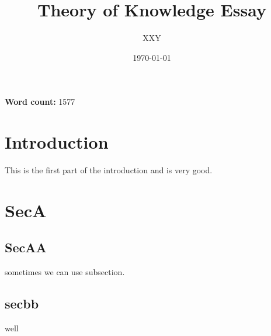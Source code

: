 \documentclass[12pt,a4paper]{article}
\title{\textbf{Theory of Knowledge Essay}}
\author{XXY}
\date{\today}
\begin{document}
\begin{titlepage}
    \maketitle
    \thispagestyle{empty}
    \vfill

    \centering


    \textbf{Word count:} 1577
\end{titlepage}

\tableofcontents

\clearpage

\section{Introduction}

This is the first part of the introduction and is very good.

\section{SecA}

\subsection{SecAA}

sometimes we can use subsection.

\subsection{secbb}

well


\clearpage




\end{document}
